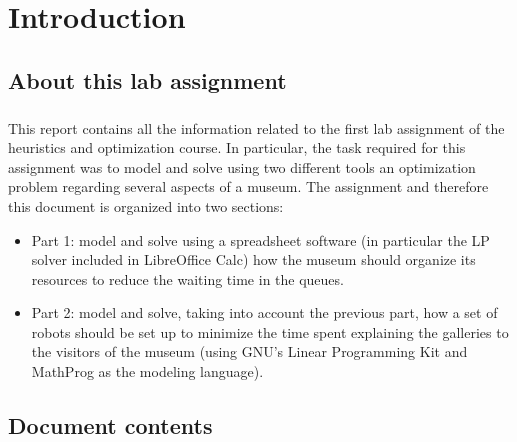 \chapter{Introduction}
\label{chapter: introduction}

\section{About this lab assignment}

\paragraph{}
This report contains all the information related to the first lab assignment of the heuristics and optimization course. In particular, the task required for this assignment was to model and solve using two different tools an optimization problem regarding several aspects of a museum. The assignment and therefore this document is organized into two sections:
\begin{itemize}
    \item Part 1: model and solve using a spreadsheet software (in particular the LP solver included in LibreOffice Calc) how the museum should organize its resources to reduce the waiting time in the queues.
    
    \item Part 2: model and solve, taking into account the previous part, how a set of robots should be set up to minimize the time spent explaining the galleries to the visitors of the museum (using GNU’s Linear Programming Kit and MathProg as the modeling language).
    
\end{itemize}

\section{Document contents}

